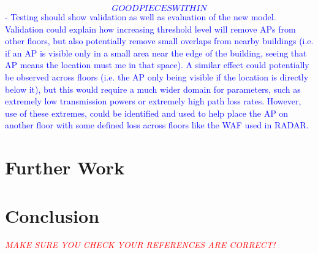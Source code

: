 \documentclass{UoYCSproject}
\begin{document}
		\textcolor{blue}{\emph{\[GOOD PIECES WITHIN\]} - Testing should show validation as well as evaluation of the new model. Validation could explain how increasing threshold level will remove APs from other floors, but also potentially remove small overlaps from nearby buildings (i.e. if an AP is visible only in a small area near the edge of the building, seeing that AP means the location must me in that space). A similar effect could potentially be observed across floors (i.e. the AP only being visible if the location is directly below it), but this would require a much wider domain for parameters, such as extremely low transmission powers or extremely high path loss rates. However, use of these extremes, could be identified and used to help place the AP on another floor with some defined loss across floors like the WAF used in RADAR.}
	
	\chapter{Further Work}
	
	\chapter{Conclusion}
    
    \textcolor{red}{\emph{MAKE SURE YOU CHECK YOUR REFERENCES ARE CORRECT!}}
        
    
	
\end{document}
